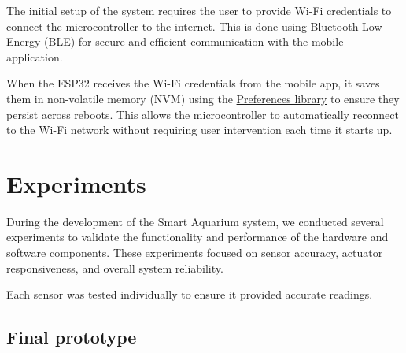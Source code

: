 \documentclass[11pt,a4paper]{article}
\begin{document}
The initial setup of the system requires the user to provide Wi-Fi credentials to connect the microcontroller to the internet. This is done using Bluetooth Low Energy (BLE) for secure and efficient communication with the mobile application.

When the ESP32 receives the Wi-Fi credentials from the mobile app, it saves them in non-volatile memory (NVM) using the \href{https://github.com/vshymanskyy/Preferences}{Preferences library} to ensure they persist across reboots. This allows the microcontroller to automatically reconnect to the Wi-Fi network without requiring user intervention each time it starts up.

\pagebreak

\section{Experiments}

During the development of the Smart Aquarium system, we conducted several experiments to validate the functionality and performance of the hardware and software components. These experiments focused on sensor accuracy, actuator responsiveness, and overall system reliability.

Each sensor was tested individually to ensure it provided accurate readings.

\subsection{Final prototype}
\end{document}

